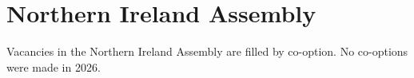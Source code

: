 \documentclass[a4paper,openany]{book}
\begin{document}
%
%
%

%
%

\section{Northern Ireland Assembly}

Vacancies in the Northern Ireland Assembly are filled by co-option.
No co-options were made in 2026.
%
\end{document}
